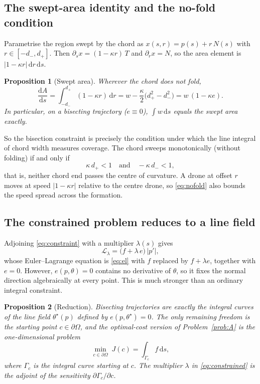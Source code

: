 \documentclass[11pt,a4paper]{article}
\numberwithin{equation}{section}
\theoremstyle{plain}
\newtheorem{proposition}{Proposition}[section]
\theoremstyle{definition}
\theoremstyle{remark}
\newcommand{\dd}{\mathrm{d}}
\newcommand{\pO}{\partial\Omega}
\begin{document}
\subsection{The swept-area identity and the no-fold condition}

Parametrise the region swept by the chord as $x(s,r)=p(s)+r\,N(s)$ with $r\in[-d_-,d_+]$. Then $\partial_s x=(1-\kappa r)\,T$ and $\partial_r x=N$, so the area element is $|1-\kappa r|\,\dd r\,\dd s$.

\begin{proposition}[Swept area]\label{prop:area}
Wherever the chord does not fold,
\begin{equation}
\frac{\dd A}{\dd s} = \int_{-d_-}^{d_+}(1-\kappa r)\,\dd r = w - \frac{\kappa}{2}\bigl(d_+^2-d_-^2\bigr) = w\,(1-\kappa e).
\label{eq:area}
\end{equation}
In particular, on a bisecting trajectory ($e\equiv0$), $\int w\,\dd s$ equals the swept area \emph{exactly}.
\end{proposition}

So the bisection constraint is precisely the condition under which the line integral of chord width measures coverage. The chord sweeps monotonically (without folding) if and only if
\begin{equation}
\kappa\,d_+ < 1 \quad\text{and}\quad -\kappa\,d_- < 1,
\label{eq:nofold}
\end{equation}
that is, neither chord end passes the centre of curvature. A drone at offset $r$ moves at speed $|1-\kappa r|$ relative to the centre drone, so \eqref{eq:nofold} also bounds the speed spread across the formation.

\subsection{The constrained problem reduces to a line field}

Adjoining \eqref{eq:constraint} with a multiplier $\lambda(s)$ gives
\begin{equation}
\mathcal L_\lambda = \bigl(f + \lambda\,e\bigr)\,|p'| ,
\label{eq:constrained}
\end{equation}
whose Euler--Lagrange equation is \eqref{eq:el} with $f$ replaced by $f+\lambda e$, together with $e=0$. However, $e(p,\theta)=0$ contains no derivative of $\theta$, so it fixes the normal direction algebraically at every point. This is much stronger than an ordinary integral constraint.

\begin{proposition}[Reduction]\label{prop:reduction}
Bisecting trajectories are exactly the integral curves of the line field $\theta^\star(p)$ defined by $e(p,\theta^\star)=0$. The only remaining freedom is the starting point $c\in\pO$, and the optimal-cost version of Problem~\ref{prob:A} is the one-dimensional problem
\begin{equation}
\min_{c\in\pO}\; J(c)=\int_{\Gamma_c} f\,\dd s ,
\label{eq:search}
\end{equation}
where $\Gamma_c$ is the integral curve starting at $c$. The multiplier $\lambda$ in \eqref{eq:constrained} is the adjoint of the sensitivity $\partial\Gamma_c/\partial c$.
\end{proposition}
\end{document}
